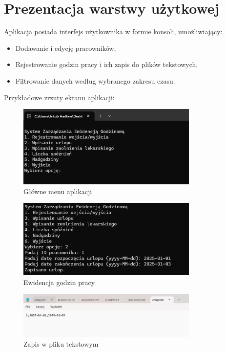 \chapter{Prezentacja warstwy użytkowej}
\noindent Aplikacja posiada interfejs użytkownika w formie konsoli, umożliwiający:
\begin{itemize}
    \item Dodawanie i edycję pracowników,
    \item Rejestrowanie godzin pracy i ich zapis do plików tekstowych,
    \item Filtrowanie danych według wybranego zakresu czasu.
\end{itemize}

\noindent Przykładowe zrzuty ekranu aplikacji:
\begin{figure}[h]
    \centering
    \includegraphics[width=0.8\textwidth]{ss1.png}
    \caption{Główne menu aplikacji}
\end{figure}

\begin{figure}[h]
    \centering
    \includegraphics[width=0.8\textwidth]{ss2.png}
    \caption{Ewidencja godzin pracy}
\end{figure}
\begin{figure}[h]
    \centering
    \includegraphics[width=0.8\textwidth]{ss3.png}
    \caption{Zapis w pliku tekstowym}
\end{figure}